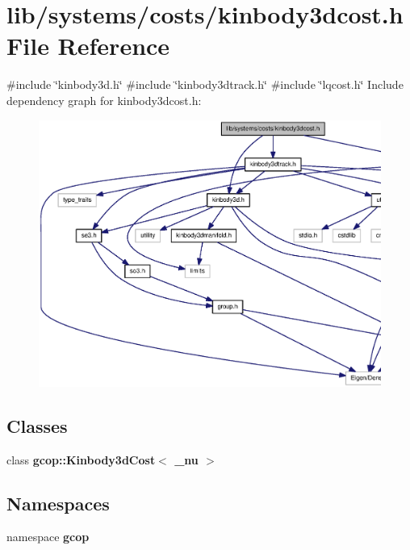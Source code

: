 \section{lib/systems/costs/kinbody3dcost.h \-File \-Reference}
\label{kinbody3dcost_8h}
{\ttfamily \#include \char`\"{}kinbody3d.\-h\char`\"{}}\*
{\ttfamily \#include \char`\"{}kinbody3dtrack.\-h\char`\"{}}\*
{\ttfamily \#include \char`\"{}lqcost.\-h\char`\"{}}\*
\-Include dependency graph for kinbody3dcost.\-h\-:\nopagebreak
\begin{figure}[H]
\begin{center}
\leavevmode
\includegraphics[width=350pt]{kinbody3dcost_8h__incl}
\end{center}
\end{figure}
\subsection*{\-Classes}
\begin{DoxyCompactItemize}
\item 
class {\bf gcop\-::\-Kinbody3d\-Cost$<$ \-\_\-nu $>$}
\end{DoxyCompactItemize}
\subsection*{\-Namespaces}
\begin{DoxyCompactItemize}
\item 
namespace {\bf gcop}
\end{DoxyCompactItemize}
